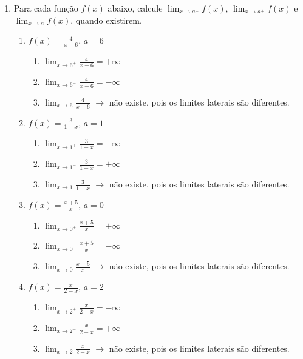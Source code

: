 \documentclass[a4paper, 12pt]{article}
\begin{document}
\begin{enumerate}
\begin{enumerate}
    \end{enumerate}
    
    \item Para cada função $f(x)$ abaixo, calcule $\lim_{x \to a^+} f(x)$, $\lim_{x \to a^+} f(x)$ e $\lim_{x \to a} f(x)$, quando existirem.
    
    \newcommand{\naoexiste}{$\rightarrow$ não existe, pois os limites laterais são diferentes.}
    
    \begin{enumerate}
        \item $f(x) = \frac{4}{x-6}$, $a=6$
        
        \begin{enumerate}
            \item $\lim_{x \to 6^+} \frac{4}{x-6} = + \infty$
            \item $\lim_{x \to 6^-} \frac{4}{x-6} = - \infty$
            \item $\lim_{x \to 6} \frac{4}{x-6}$ \naoexiste
        \end{enumerate}

        \item $f(x) = \frac{3}{1-x}$, $a=1$
        
        \begin{enumerate}
            \item $\lim_{x \to 1^+} \frac{3}{1-x} = - \infty$
            \item $\lim_{x \to 1^-} \frac{3}{1-x} = + \infty$
            \item $\lim_{x \to 1} \frac{3}{1-x}$ \naoexiste
        \end{enumerate}

        \item $f(x) = \frac{x+5}{x}$, $a=0$
        
        \begin{enumerate}
            \item $\lim_{x \to 0^+} \frac{x+5}{x} = + \infty$
            \item $\lim_{x \to 0^-} \frac{x+5}{x} = - \infty$
            \item $\lim_{x \to 0} \frac{x+5}{x}$ \naoexiste
        \end{enumerate}

        \item $f(x) = \frac{x}{2-x}$, $a=2$
        
        \begin{enumerate}
            \item $\lim_{x \to 2^+} \frac{x}{2-x} = - \infty$
            \item $\lim_{x \to 2^-} \frac{x}{2-x} = + \infty$
            \item $\lim_{x \to 2} \frac{x}{2-x}$ \naoexiste
        \end{enumerate}


\end{enumerate}
\end{enumerate}
\end{document}
